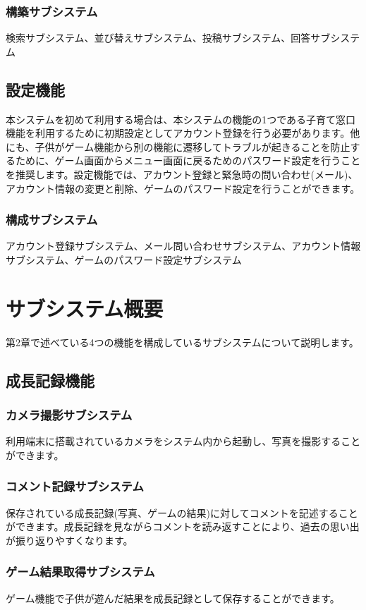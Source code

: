 \documentclass[a4j]{jarticle}
\begin{document}
\subsubsection*{構築サブシステム}
\noindent 検索サブシステム、並び替えサブシステム、投稿サブシステム、回答サブシステム

\subsection{設定機能}
本システムを初めて利用する場合は、本システムの機能の1つである子育て窓口機能を利用するために初期設定としてアカウント登録を行う必要があります。他にも、子供がゲーム機能から別の機能に遷移してトラブルが起きることを防止するために、ゲーム画面からメニュー画面に戻るためのパスワード設定を行うことを推奨します。設定機能では、アカウント登録と緊急時の問い合わせ(メール)、アカウント情報の変更と削除、ゲームのパスワード設定を行うことができます。
\subsubsection*{構成サブシステム}
\noindent アカウント登録サブシステム、メール問い合わせサブシステム、アカウント情報サブシステム、ゲームのパスワード設定サブシステム



\newpage
\section{サブシステム概要}
第2章で述べている4つの機能を構成しているサブシステムについて説明します。

\subsection{成長記録機能}
\subsubsection*{カメラ撮影サブシステム}
利用端末に搭載されているカメラをシステム内から起動し、写真を撮影することができます。
\subsubsection*{コメント記録サブシステム}
保存されている成長記録(写真、ゲームの結果)に対してコメントを記述することができます。成長記録を見ながらコメントを読み返すことにより、過去の思い出が振り返りやすくなります。
\subsubsection*{ゲーム結果取得サブシステム}
ゲーム機能で子供が遊んだ結果を成長記録として保存することができます。
\end{document}
